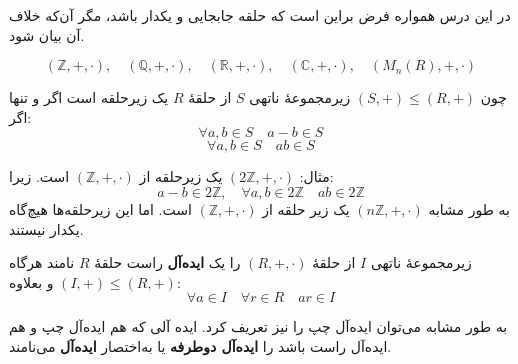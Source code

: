 \begin{frame}

    \begin{remark}
        در این درس همواره فرض براین است که حلقه جابجایی و یکدار باشد، مگر آن‌که خلاف آن بیان شود.
    \end{remark}

    \begin{example}
        \[
            (\mathbb{Z}, +, \cdot),\quad (\mathbb{Q}, +, \cdot),\quad (\mathbb{R}, +, \cdot),\quad (\mathbb{C}, +, \cdot),\quad (M_n(R), +, \cdot)
        \]
    \end{example}


    \begin{definition}
        چون $(S, +) \leqslant (R, +)$ زیرمجموعهٔ ناتهی $S$ از حلقهٔ $R$ یک زیرحلقه است اگر و تنها اگر:
        \[
            \forall a, b \in S \quad a - b \in S
        \]
        \[
            \forall a, b \in S \quad ab \in S
        \]

    \end{definition}


\end{frame}

\begin{frame}
    \begin{remark}
        مثال: $(2\mathbb{Z}, +, \cdot)$ یک زیرحلقه از $(\mathbb{Z}, +, \cdot)$ است.
        زیرا:
        \[
            a - b \in 2\mathbb{Z}, \quad \forall a,b \in 2\mathbb{Z} \quad ab \in 2\mathbb{Z}
        \]
        به طور مشابه
        $(n\mathbb{Z}, +, \cdot)$
        یک زیر حلقه از
        $(\mathbb{Z}, +, \cdot)$
        است.
        اما این زیرحلقه‌ها هیچ‌گاه یکدار نیستند.
    \end{remark}


    \begin{definition}[ایده‌آل]
        زیرمجموعهٔ ناتهی $I$ از حلقهٔ $(R,+,\cdot)$ را یک \textbf{ایده‌آل} راست حلقهٔ $R$ نامند هرگاه
        \((I,+) \leqslant (R, +)\)
        و بعلاوه:
        \[
            \forall a \in I \quad \forall r \in R \quad ar \in I
        \]

        به طور مشابه می‌توان ایده‌آل چپ را نیز تعریف کرد.
        ایده آلی که هم ایده‌آل چپ و هم ایده‌آل راست باشد را
        \textbf{ایده‌آل دوطرفه} یا به‌اختصار \textbf{ایده‌آل} می‌نامند.
    \end{definition}




\end{frame}

